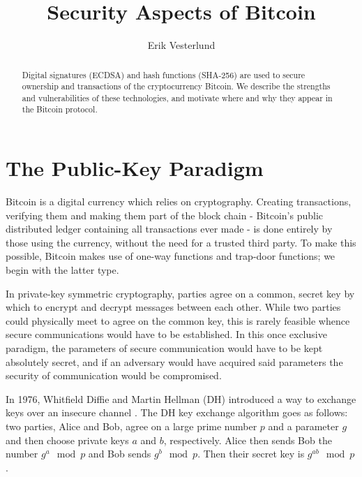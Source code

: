 \documentclass[a4paper,12pt]{article}
\title{Security Aspects of Bitcoin}
\author{Erik Vesterlund}
\newtheorem*{mydef}{Definition}
\begin{document}
\maketitle

\newpage
\begin{abstract}
Digital signatures (ECDSA) and hash functions (SHA-256) are used to secure ownership and transactions of the cryptocurrency Bitcoin. We describe the strengths and vulnerabilities of these technologies, and motivate where and why they appear in the Bitcoin protocol.
\end{abstract}
\newpage



\newpage
\tableofcontents
\newpage
{}


\section{The Public-Key Paradigm}

Bitcoin is a digital currency which relies on cryptography. Creating transactions, verifying them and making them part of the block chain - Bitcoin's public distributed ledger containing all transactions ever made - is done entirely by those using the currency, without the need for a trusted third party. To make this possible, Bitcoin makes use of one-way functions and trap-door functions; we begin with the latter type.

In private-key symmetric cryptography, parties agree on a common, secret key by which to encrypt and decrypt messages between each other. While two parties could physically meet to agree on the common key, this is rarely feasible whence secure communications would have to be established. In this once exclusive paradigm, the parameters of secure communication would have to be kept absolutely secret, and if an adversary would have acquired said parameters the security of communication would be compromised.

In 1976, Whitfield Diffie and Martin Hellman (DH) introduced a way to exchange keys over an insecure channel \cite[p. 66]{hoffstein}. The DH key exchange algorithm goes as follows: two parties, Alice and Bob, agree on a large prime number $p$ and a parameter $g$ and then choose private keys $a$ and $b$, respectively. Alice then sends Bob the number $g^a \mod p$ and Bob sends $g^b \mod p$. Then their secret key is $g^{ab} \mod p$.
\end{document}
